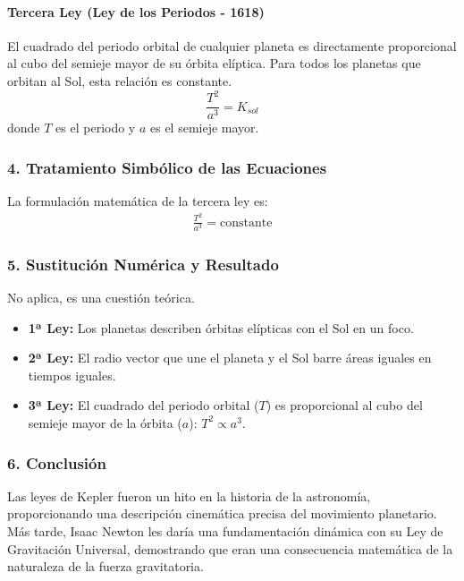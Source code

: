 \paragraph*{Tercera Ley (Ley de los Periodos - 1618)}
El cuadrado del periodo orbital de cualquier planeta es directamente proporcional al cubo del semieje mayor de su órbita elíptica. Para todos los planetas que orbitan al Sol, esta relación es constante.
$$ \frac{T^2}{a^3} = K_{sol} $$
donde $T$ es el periodo y $a$ es el semieje mayor.

\subsubsection*{4. Tratamiento Simbólico de las Ecuaciones}
La formulación matemática de la tercera ley es:
\begin{gather}
    \frac{T^2}{a^3} = \text{constante}
\end{gather}

\subsubsection*{5. Sustitución Numérica y Resultado}
No aplica, es una cuestión teórica.
\begin{cajaresultado}
\begin{itemize}
    \item \textbf{1ª Ley:} Los planetas describen órbitas elípticas con el Sol en un foco.
    \item \textbf{2ª Ley:} El radio vector que une el planeta y el Sol barre áreas iguales en tiempos iguales.
    \item \textbf{3ª Ley:} El cuadrado del periodo orbital ($T$) es proporcional al cubo del semieje mayor de la órbita ($a$): $T^2 \propto a^3$.
\end{itemize}
\end{cajaresultado}

\subsubsection*{6. Conclusión}
\begin{cajaconclusion}
Las leyes de Kepler fueron un hito en la historia de la astronomía, proporcionando una descripción cinemática precisa del movimiento planetario. Más tarde, Isaac Newton les daría una fundamentación dinámica con su Ley de Gravitación Universal, demostrando que eran una consecuencia matemática de la naturaleza de la fuerza gravitatoria.
\end{cajaconclusion}

